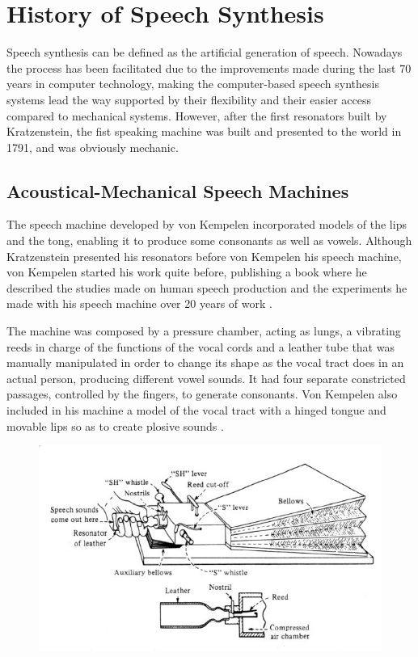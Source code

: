 \section{History of Speech Synthesis}
\label{history_speech_synthesis}
Speech synthesis can be defined as the artificial generation of speech. Nowadays the process has been facilitated due to the improvements made during the last 70 years in computer technology, making the computer-based speech synthesis systems lead the way supported by their flexibility and their easier access compared to mechanical systems. However, after the first resonators built by Kratzenstein, the fist speaking machine was built and presented to the world in 1791, and was obviously mechanic.

\subsection{Acoustical-Mechanical Speech Machines}
The speech machine developed by von Kempelen incorporated models of the lips and the tong, enabling it to produce some consonants as well as vowels. Although Kratzenstein presented his resonators before von Kempelen his speech machine, von Kempelen started his work quite before, publishing a book where he described the studies made on human speech production and the experiments he made with his speech machine over 20 years of work \cite{vonKempelen}.  

The machine was composed by a pressure chamber, acting as lungs, a vibrating reeds in charge of the functions of the vocal cords and a leather tube that was manually manipulated in order to change its shape as the vocal tract does in an actual person, producing different vowel sounds. It had four separate constricted passages, controlled by the fingers, to generate consonants. Von Kempelen also included in his machine a model of the vocal tract with a hinged tongue and movable lips so as to create plosive sounds \cite{Schroeder93, LemmettyMSc, flanagan_1973_speech}. 



\begin{figure}[htb]
	\begin{center}
		\includegraphics[width=\textwidth]{images/von_kempelen_machine.jpg}
		\caption{\cite{flanagan_book}}
	\end{center}
\end{figure}